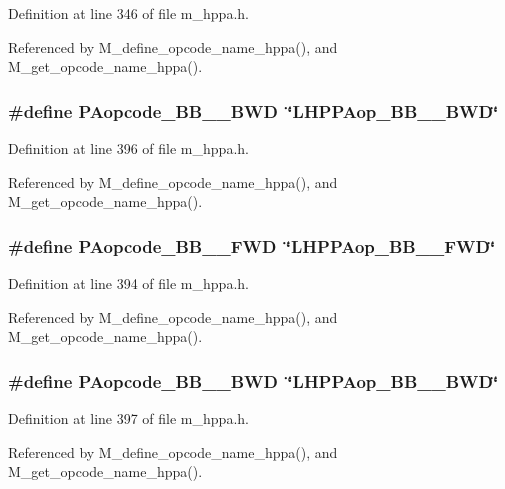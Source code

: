 Definition at line 346 of file m\_\-hppa.h.

Referenced by M\_\-define\_\-opcode\_\-name\_\-hppa(), and M\_\-get\_\-opcode\_\-name\_\-hppa().
\subsubsection{\setlength{\rightskip}{0pt plus 5cm}\#define PAopcode\_\-BB\_\_\-BWD~\char`\"{}LHPPAop\_\-BB\_\_\-BWD\char`\"{}}\label{m__hppa_8h_39f48f7e2d7ca7a104c2686f88c0b9b9}




Definition at line 396 of file m\_\-hppa.h.

Referenced by M\_\-define\_\-opcode\_\-name\_\-hppa(), and M\_\-get\_\-opcode\_\-name\_\-hppa().
\subsubsection{\setlength{\rightskip}{0pt plus 5cm}\#define PAopcode\_\-BB\_\_\-FWD~\char`\"{}LHPPAop\_\-BB\_\_\-FWD\char`\"{}}\label{m__hppa_8h_014de1e18ce91f3e3fb805c0169b7bfa}




Definition at line 394 of file m\_\-hppa.h.

Referenced by M\_\-define\_\-opcode\_\-name\_\-hppa(), and M\_\-get\_\-opcode\_\-name\_\-hppa().
\subsubsection{\setlength{\rightskip}{0pt plus 5cm}\#define PAopcode\_\-BB\_\_\-BWD~\char`\"{}LHPPAop\_\-BB\_\_\-BWD\char`\"{}}\label{m__hppa_8h_a727190383c536db1b9b480750e904c6}




Definition at line 397 of file m\_\-hppa.h.

Referenced by M\_\-define\_\-opcode\_\-name\_\-hppa(), and M\_\-get\_\-opcode\_\-name\_\-hppa().
